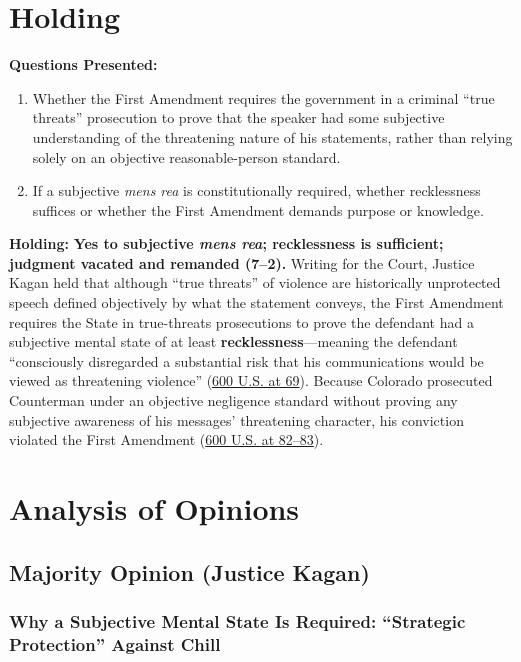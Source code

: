 \documentclass[12pt]{article}
\begin{document}
\section{Holding}
\textbf{Questions Presented:}

\begin{enumerate}
  \item Whether the First Amendment requires the government in a criminal ``true threats'' prosecution to prove that the speaker had some subjective understanding of the threatening nature of his statements, rather than relying solely on an objective reasonable-person standard.
  \item If a subjective \textit{mens rea} is constitutionally required, whether recklessness suffices or whether the First Amendment demands purpose or knowledge.
\end{enumerate}

\textbf{Holding:} \textbf{Yes to subjective \textit{mens rea}; recklessness is sufficient; judgment vacated and remanded (7--2).} Writing for the Court, Justice Kagan held that although ``true threats'' of violence are historically unprotected speech defined objectively by what the statement conveys, the First Amendment requires the State in true-threats prosecutions to prove the defendant had a subjective mental state of at least \textbf{recklessness}---meaning the defendant ``consciously disregarded a substantial risk that his communications would be viewed as threatening violence'' (\href{https://www.supremecourt.gov/opinions/22pdf/600us1r51_g3bi.pdf}{600 U.S. at 69}). Because Colorado prosecuted Counterman under an objective negligence standard without proving any subjective awareness of his messages' threatening character, his conviction violated the First Amendment (\href{https://supreme.justia.com/cases/federal/us/600/22-138/}{600 U.S. at 82--83}).

\section{Analysis of Opinions}
\subsection{Majority Opinion (Justice Kagan)}

\subsubsection{Why a Subjective Mental State Is Required: ``Strategic Protection'' Against Chill}
\end{document}
